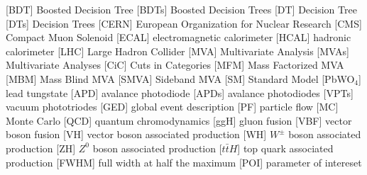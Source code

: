 \begin{acronym}[AAAAAA]
 [BDT] {Boosted Decision Tree}
 [BDTs] {Boosted Decision Trees}
 [DT] {Decision Tree}
 [DTs] {Decision Trees}
 [CERN] {European Organization for Nuclear Research}
 [CMS] {Compact Muon Solenoid}
 [ECAL] {electromagnetic calorimeter}
 [HCAL] {hadronic calorimeter}
 [LHC] {Large Hadron Collider}
 [MVA] {Multivariate Analysis}
 [MVAs] {Multivariate Analyses}
 [CiC] {Cuts in Categories}
 [MFM] {Mass Factorized MVA}
 [MBM] {Mass Blind MVA}
 [SMVA] {Sideband MVA}
 [SM] {Standard Model}
 [PbWO$_{4}$] {lead tungstate}
 [APD] {avalance photodiode}
 [APDs] {avalance photodiodes}
 [VPTs] {vacuum phototriodes}
 [GED] {global event description}
 [PF] {particle flow}
 [MC] {Monte Carlo}
 [QCD] {quantum chromodynamics}
 [ggH] {gluon fusion}
 [VBF] {vector boson fusion}
 [VH] {vector boson associated production}
 [WH] {$W^{\pm}$ boson associated production}
 [ZH] {$Z^{0}$ boson associated production}
 [$t\bar{t}H$] {top quark associated production}
 [FWHM] {full width at half the maximum}
 [POI] {parameter of intereset}
\end{acronym}



